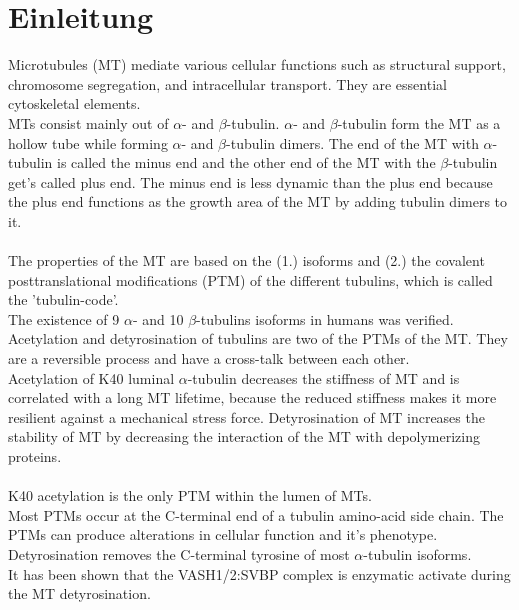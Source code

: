 \pagestyle{headings}
\setcounter{page}{1}

\section{Einleitung}

Microtubules (MT) mediate various cellular functions such as structural support, chromosome segregation, and intracellular transport. \cite{bar2022direct} They are essential cytoskeletal elements. \\
MTs consist mainly out of $\alpha$- and $\beta$-tubulin. 
$\alpha$- and $\beta$-tubulin form the MT as a hollow tube while forming  $\alpha$- and $\beta$-tubulin dimers. The end of the MT with $\alpha$-tubulin is called the minus end and the other end of the MT with the $\beta$-tubulin get's called plus end. The minus end is less dynamic than the plus end because the plus end functions as the growth area of the MT by adding tubulin dimers to it. \\\\
The properties of the MT are based on the (1.) isoforms and (2.) the covalent posttranslational modifications (PTM) of the different tubulins, which is called the 'tubulin-code'.\\
The existence of 9 $\alpha$- and 10 $\beta$-tubulins isoforms in humans was verified.\\
Acetylation and detyrosination of tubulins are two of the PTMs of the MT. They are a reversible process and have a cross-talk between each other.\\
Acetylation of K40 luminal $\alpha $-tubulin decreases the stiffness of MT and is correlated with a long MT lifetime, because the reduced stiffness makes it more resilient against a mechanical stress force. Detyrosination of MT increases the stability of MT by decreasing the interaction of the MT with depolymerizing proteins. \\\\
K40 acetylation is the only PTM within the lumen of MTs. \\
Most PTMs occur at the C-terminal end of a tubulin amino-acid side chain. The PTMs  can produce alterations in cellular function and it's phenotype. \cite{seet2006reading} Detyrosination removes the C-terminal tyrosine of most $\alpha$-tubulin isoforms. \\
It has been shown that the VASH1/2:SVBP complex is enzymatic activate during the MT detyrosination.



